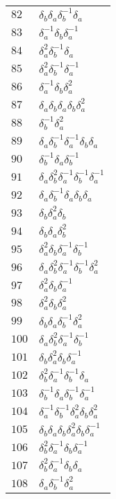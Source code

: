 \documentclass{article}
\begin{document}
\begin{center}
\begin{tabular}{ll}
$82$ & $\delta_b^{}\delta_a^{}\delta_b^{-1}\delta_a^{}$ \\
$83$ & $\delta_a^{-1}\delta_b^{}\delta_a^{-1}$ \\
$84$ & $\delta_a^{2}\delta_b^{-1}\delta_a^{}$ \\
$85$ & $\delta_a^{2}\delta_b^{-1}\delta_a^{-1}$ \\
$86$ & $\delta_a^{-1}\delta_b^{}\delta_a^{2}$ \\
$87$ & $\delta_a^{}\delta_b^{}\delta_a^{}\delta_b^{}\delta_a^{2}$ \\
$88$ & $\delta_b^{-1}\delta_a^{2}$ \\
$89$ & $\delta_a^{}\delta_b^{-1}\delta_a^{-1}\delta_b^{}\delta_a^{}$ \\
$90$ & $\delta_b^{-1}\delta_a^{}\delta_b^{-1}$ \\
$91$ & $\delta_a^{}\delta_b^{2}\delta_a^{-1}\delta_b^{-1}\delta_a^{-1}$ \\
$92$ & $\delta_a^{}\delta_b^{-1}\delta_a^{}\delta_b^{}\delta_a^{}$ \\
$93$ & $\delta_b^{}\delta_a^{2}\delta_b^{}$ \\
$94$ & $\delta_b^{}\delta_a^{}\delta_b^{2}$ \\
$95$ & $\delta_a^{2}\delta_b^{}\delta_a^{-1}\delta_b^{-1}$ \\
$96$ & $\delta_a^{}\delta_b^{2}\delta_a^{-1}\delta_b^{-1}\delta_a^{2}$ \\
$97$ & $\delta_a^{2}\delta_b^{}\delta_a^{-1}$ \\
$98$ & $\delta_a^{2}\delta_b^{}\delta_a^{2}$ \\
$99$ & $\delta_b^{}\delta_a^{}\delta_b^{-1}\delta_a^{2}$ \\
$100$ & $\delta_a^{}\delta_b^{2}\delta_a^{-1}\delta_b^{-1}$ \\
$101$ & $\delta_b^{}\delta_a^{2}\delta_b^{}\delta_a^{-1}$ \\
$102$ & $\delta_b^{2}\delta_a^{-1}\delta_b^{-1}\delta_a^{}$ \\
$103$ & $\delta_b^{-1}\delta_a^{}\delta_b^{-1}\delta_a^{-1}$ \\
$104$ & $\delta_a^{-1}\delta_b^{-1}\delta_a^{2}\delta_b^{}\delta_a^{2}$ \\
$105$ & $\delta_b^{}\delta_a^{}\delta_b^{}\delta_a^{2}\delta_b^{}\delta_a^{-1}$ \\
$106$ & $\delta_b^{2}\delta_a^{-1}\delta_b^{}\delta_a^{-1}$ \\
$107$ & $\delta_b^{2}\delta_a^{-1}\delta_b^{}\delta_a^{}$ \\
$108$ & $\delta_a^{}\delta_b^{-1}\delta_a^{2}$ \\

\end{tabular}
\end{center}
\end{document}
